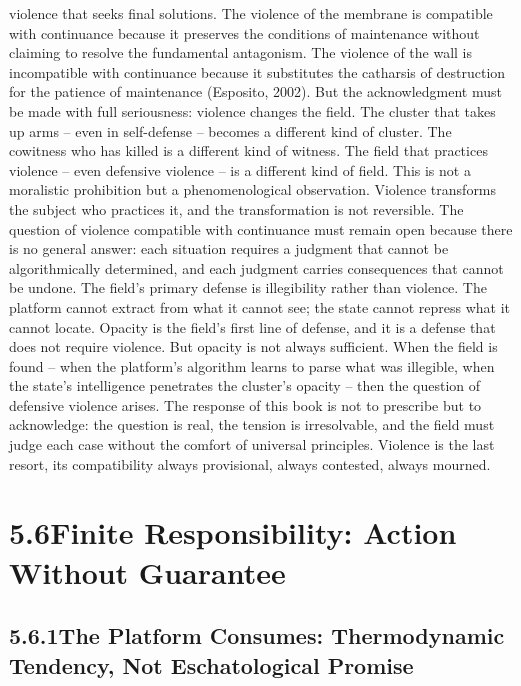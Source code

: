 violence that seeks final solutions. The violence of the membrane is compatible with continuance because it preserves the conditions of maintenance without claiming to resolve the fundamental antagonism. The violence of the wall is incompatible with continuance because it substitutes the catharsis of destruction for the patience of maintenance (Esposito, 2002). But the acknowledgment must be made with full seriousness: violence changes the field. The cluster that takes up arms – even in self-defense – becomes a different kind of cluster. The cowitness who has killed is a different kind of witness. The field that practices violence – even defensive violence – is a different kind of field. This is not a moralistic prohibition but a phenomenological observation. Violence transforms the subject who practices it, and the transformation is not reversible. The question of violence compatible with continuance must remain open because there is no general answer: each situation requires a judgment that cannot be algorithmically determined, and each judgment carries consequences that cannot be undone. The field’s primary defense is illegibility rather than violence. The platform cannot extract from what it cannot see; the state cannot repress what it cannot locate. Opacity is the field’s first line of defense, and it is a defense that does not require violence. But opacity is not always sufficient. When the field is found – when the platform’s algorithm learns to parse what was illegible, when the state’s intelligence penetrates the cluster’s opacity – then the question of defensive violence arises. The response of this book is not to prescribe but to acknowledge: the question is real, the tension is irresolvable, and the field must judge each case without the comfort of universal principles. Violence is the last resort, its compatibility always provisional, always contested, always mourned.

\section{5.6\quad Finite Responsibility: Action Without Guarantee}

\subsection{5.6.1\quad The Platform Consumes: Thermodynamic Tendency, Not Eschatological Promise}

